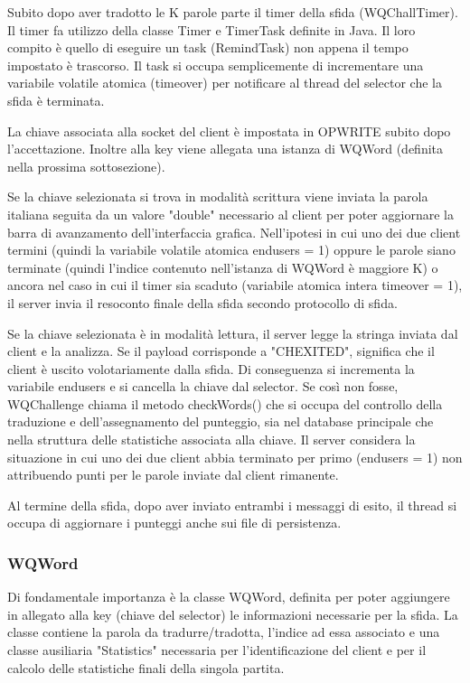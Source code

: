 \documentclass{article}
\begin{document}
Subito dopo aver tradotto le K parole parte il timer della sfida (WQChallTimer). Il timer fa utilizzo della classe Timer e TimerTask definite in Java. Il loro compito è quello di eseguire un task (RemindTask) non appena il tempo impostato è trascorso. Il task si occupa semplicemente di incrementare una variabile volatile atomica (timeover) per notificare al thread del selector che la sfida è terminata.

La chiave associata alla socket del client è impostata in OP\textunderscore WRITE subito dopo l'accettazione. Inoltre alla key viene allegata una istanza di WQWord (definita nella prossima sottosezione). 

Se la chiave selezionata si trova in modalità scrittura viene inviata la parola italiana seguita da un valore "double" necessario al client per poter aggiornare la barra di avanzamento dell'interfaccia grafica.
Nell'ipotesi in cui uno dei due client termini (quindi la variabile volatile atomica endusers = 1) oppure le parole siano terminate (quindi l'indice contenuto nell'istanza di WQWord è maggiore K) o ancora nel caso in cui il timer sia scaduto (variabile atomica intera timeover = 1), il server invia il resoconto finale della sfida secondo protocollo di sfida.

Se la chiave selezionata è in modalità lettura, il server legge la stringa inviata dal client e la analizza. Se il payload corrisponde a "CHEXITED", significa che il client è uscito volotariamente dalla sfida. Di conseguenza si incrementa la variabile endusers e si cancella la chiave dal selector. Se così non fosse, WQChallenge chiama il metodo checkWords() che si occupa del controllo della traduzione e dell'assegnamento del punteggio, sia nel database principale che nella struttura delle statistiche associata alla chiave. Il server considera la situazione in cui uno dei due client abbia terminato per primo (endusers = 1) non attribuendo punti per le parole inviate dal client rimanente.

Al termine della sfida, dopo aver inviato entrambi i messaggi di esito, il thread si occupa di aggiornare i punteggi anche sui file di persistenza.

\subsubsection{WQWord}
Di fondamentale importanza è la classe WQWord, definita per poter aggiungere in allegato alla key (chiave del selector) le informazioni necessarie per la sfida. La classe contiene la parola da tradurre/tradotta, l'indice ad essa associato e una classe ausiliaria "Statistics" necessaria per l'identificazione del client e per il calcolo delle statistiche finali della singola partita.
\end{document}
